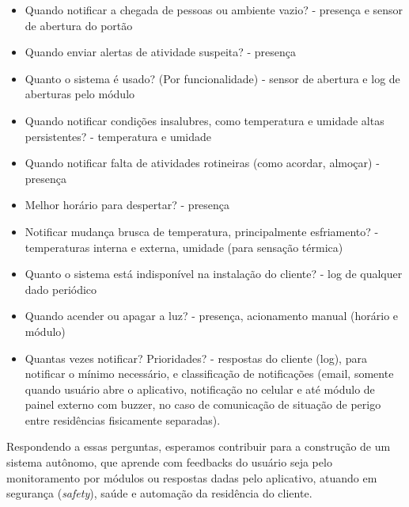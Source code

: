 \begin{itemize}
\item Quando notificar a chegada de pessoas ou ambiente vazio? - presença e sensor de abertura do portão
\item Quando enviar alertas de atividade suspeita? - presença
\item Quanto o sistema é usado? (Por funcionalidade) - sensor de abertura e log de aberturas pelo módulo
\item Quando notificar condições insalubres, como temperatura e umidade altas persistentes? - temperatura e umidade
\item Quando notificar falta de atividades rotineiras (como acordar, almoçar) - presença
\item Melhor horário para despertar? - presença
\item Notificar mudança brusca de temperatura, principalmente esfriamento? - temperaturas interna e externa, umidade (para sensação térmica)
\item Quanto o sistema está indisponível na instalação do cliente? - log de qualquer dado periódico
\item Quando acender ou apagar a luz? - presença, acionamento manual (horário e módulo)
\item Quantas vezes notificar? Prioridades? - respostas do cliente (log), para notificar o mínimo necessário, e classificação de notificações (email, somente quando usuário abre o aplicativo, notificação no celular e até módulo de painel externo com buzzer, no caso de comunicação de situação de perigo entre residências fisicamente separadas).
\end{itemize}

Respondendo a essas perguntas, esperamos contribuir para a construção de um sistema autônomo, que aprende com feedbacks do usuário seja pelo monitoramento por módulos ou respostas dadas pelo aplicativo, atuando em segurança (\textit{safety}), saúde e automação da residência do cliente.
